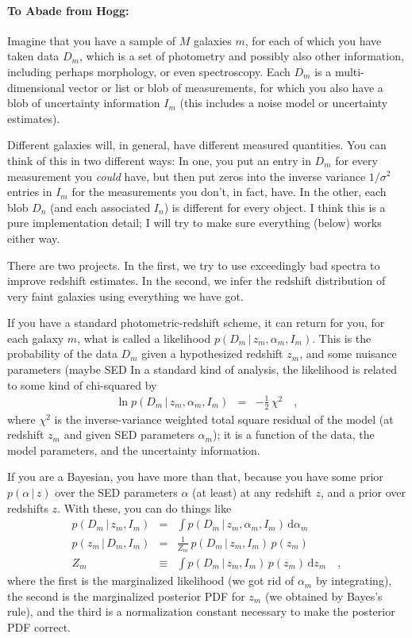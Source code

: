 \documentclass[12pt]{article}
\newcommand{\given}{\,|\,}
\newcommand{\dd}{\mathrm d}
\begin{document}
\paragraph{To Abade from Hogg:}
Imagine that you have a sample of $M$ galaxies $m$, for each of which
you have taken data $D_m$, which is a set of photometry and possibly
also other information, including perhaps morphology, or even
spectroscopy.  Each $D_m$ is a multi-dimensional vector or list or
blob of measurements, for which you also have a blob of uncertainty
information $I_m$ (this includes a noise model or uncertainty
estimates).

Different galaxies will, in general, have different measured
quantities.  You can think of this in two different ways: In one, you
put an entry in $D_m$ for every measurement you \emph{could} have, but
then put zeros into the inverse variance $1/\sigma^2$ entries in $I_m$
for the measurements you don't, in fact, have.  In the other, each
blob $D_n$ (and each associated $I_n$) is different for every object.
I think this is a pure implementation detail; I will try to make sure
everything (below) works either way.

There are two projects.  In the first, we try to use exceedingly bad
spectra to improve redshift estimates.  In the second, we infer the
redshift distribution of very faint galaxies using everything we have
got.

If you have a standard photometric-redshift scheme, it can return for
you, for each galaxy $m$, what is called a likelihood $p(D_m \given
z_m,\alpha_m,I_m)$.  This is the probability of the data $D_m$ given a
hypothesized redshift $z_m$, and some nuisance parameters (maybe SED
In a standard kind of analysis, the likelihood is related to some kind
of chi-squared by
\begin{eqnarray}
\ln p(D_m \given z_m, \alpha_m, I_m) &=& -\frac{1}{2}\,\chi^2
\quad,
\end{eqnarray}
where $\chi^2$ is the inverse-variance weighted total square residual
of the model (at redshift $z_m$ and given SED parameters $\alpha_m$);
it is a function of the data, the model parameters, and the
uncertainty information.

If you are a Bayesian, you have more than that, because you have some
prior $p(\alpha \given z)$ over the SED parameters $\alpha$ (at least)
at any redshift $z$, and a prior over redshifts $z$.  With these, you
can do things like
\begin{eqnarray}
p(D_m \given z_m, I_m) &=& \int p(D_m \given z_m, \alpha_m, I_m)\,\dd \alpha_m
\\
p(z_m \given D_m, I_m) &=& \frac{1}{Z_m}\,p(D_m \given z_m, I_m)\,p(z_m)
\\
Z_m &\equiv& \int p(D_m \given z_m, I_m)\,p(z_m)\,\dd z_m
\quad ,
\end{eqnarray}
where the first is the marginalized likelihood (we got rid of
$\alpha_m$ by integrating), the second is the marginalized posterior
PDF for $z_m$ (we obtained by Bayes's rule), and the third is a
normalization constant necessary to make the posterior PDF correct.
\end{document}
